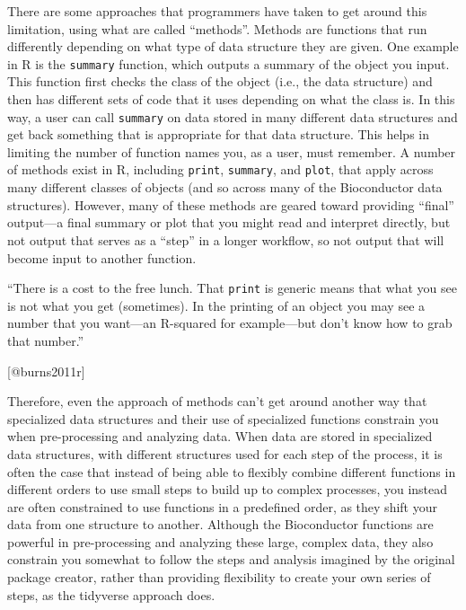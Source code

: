 \documentclass[]{tufte-book}
\begin{document}
There are some approaches that programmers have taken to get around this limitation,
using what are called ``methods''. Methods are functions that run differently
depending on what type of data structure they are given. One example in R is
the \texttt{summary} function, which outputs a summary of the object you input. This
function first checks the class of the object (i.e., the data structure) and
then has different sets of code that it uses depending on what the class is. In
this way, a user can call \texttt{summary} on data stored in many different data
structures and get back something that is appropriate for that data structure.
This helps in limiting the number of function names you, as a user, must remember.
A number of methods exist in R, including \texttt{print}, \texttt{summary}, and \texttt{plot}, that
apply across many different classes of objects (and so across many of the
Bioconductor data structures). However, many of these methods are geared toward
providing ``final'' output---a final summary or plot that you might read and
interpret directly, but not output that serves as a ``step'' in a longer workflow,
so not output that will become input to another function.

\begin{marginfigure}
``There is a cost to the free lunch. That \texttt{print} is generic
means that what you see is not what you get (sometimes). In the printing
of an object you may see a number that you want---an R-squared for
example---but don't know how to grab that number.''

{[}@burns2011r{]}
\end{marginfigure}

Therefore, even the approach of methods can't get around another way that
specialized data structures and their use of specialized functions constrain you
when pre-processing and analyzing data. When data are stored in specialized data
structures, with different structures used for each step of the process, it is
often the case that instead of being able to flexibly combine different
functions in different orders to use small steps to build up to complex
processes, you instead are often constrained to use functions in a predefined
order, as they shift your data from one structure to another. Although the
Bioconductor functions are powerful in pre-processing and analyzing these large,
complex data, they also constrain you somewhat to follow the steps and analysis
imagined by the original package creator, rather than providing flexibility to
create your own series of steps, as the tidyverse approach does.
\end{document}
